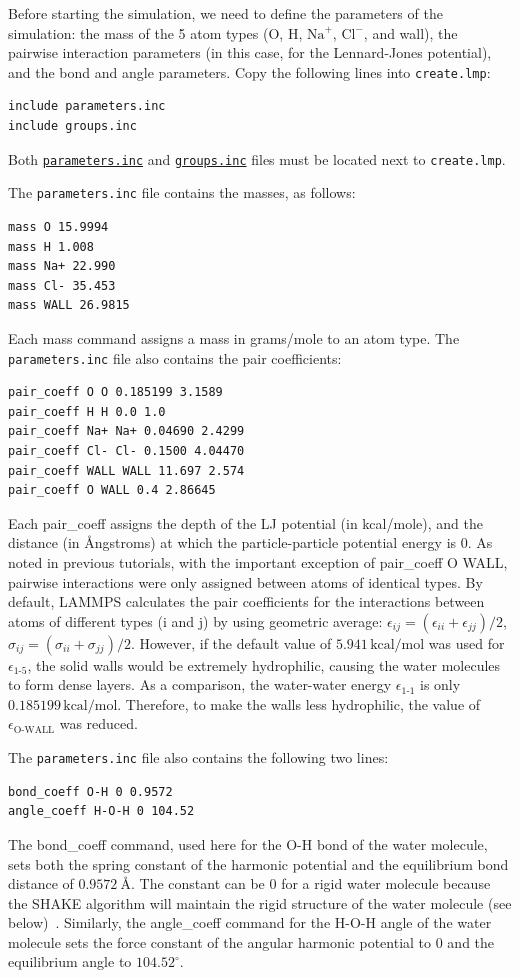\documentclass[9pt,tutorial]{livecoms}
\newcommand{\lmpcmd}[1]{\hspace{0pt}\colorbox{listing}{\textcolor{command}{\small{#1}}}\hspace{0pt}} %
\newcommand{\flecmd}[1]{\textcolor{command}{\texttt{#1}}} %
\newcommand{\dwlcmd}[1]{\textcolor{download}{\texttt{#1}}} %
\newcommand{\filepath}{https://raw.githubusercontent.com/lammpstutorials/lammpstutorials-article/main/files/}
\begin{document}
Before starting the simulation, we need to define the parameters of the
simulation: the mass of the 5 atom types (O, H, $\text{Na}^+$, $\text{Cl}^-$,
and wall), the pairwise interaction parameters (in this case, for the
Lennard-Jones potential), and the bond and angle parameters.  Copy the following
lines into \flecmd{create.lmp}:
\begin{lstlisting}
include parameters.inc
include groups.inc
\end{lstlisting}
Both \href{\filepath tutorial4/parameters.inc}{\dwlcmd{parameters.inc}}
and \href{\filepath tutorial4/groups.inc}{\dwlcmd{groups.inc}} files
must be located next to \flecmd{create.lmp}.

The \flecmd{parameters.inc} file contains the masses, as follows:
\begin{lstlisting}
mass O 15.9994
mass H 1.008
mass Na+ 22.990
mass Cl- 35.453
mass WALL 26.9815
\end{lstlisting}
Each \lmpcmd{mass} command assigns a mass in grams/mole to an atom type.
The \flecmd{parameters.inc} file also contains the pair coefficients:
\begin{lstlisting}
pair_coeff O O 0.185199 3.1589
pair_coeff H H 0.0 1.0
pair_coeff Na+ Na+ 0.04690 2.4299
pair_coeff Cl- Cl- 0.1500 4.04470
pair_coeff WALL WALL 11.697 2.574
pair_coeff O WALL 0.4 2.86645
\end{lstlisting}
Each \lmpcmd{pair\_coeff} assigns the depth of the LJ potential
(in kcal/mole), and the distance (in Ångstroms) at which the particle-particle
potential energy is 0.  As noted in previous tutorials, with the important exception of
\lmpcmd{pair\_coeff O WALL}, pairwise interactions were only assigned between
atoms of identical types.  By default, LAMMPS calculates the pair coefficients for the
interactions between atoms of different types (i and j) by using geometric average:
$\epsilon_{ij} = (\epsilon_{ii} + \epsilon_{jj})/2$,  $\sigma_{ij} = (\sigma_{ii} + \sigma_{jj})/2$.
However, if the default value of $5.941\,\text{kcal/mol}$ was used for $\epsilon_\text{1-5}$, the solid
walls would be extremely hydrophilic, causing the water molecules to form dense layers.  As a
comparison, the water-water energy $\epsilon_\text{1-1}$ is only $0.185199\,\text{kcal/mol}$.
Therefore, to make the walls less hydrophilic, the value of $\epsilon_\text{O-WALL}$
was reduced.

The \flecmd{parameters.inc} file also contains the following two lines:
\begin{lstlisting}
bond_coeff O-H 0 0.9572
angle_coeff H-O-H 0 104.52
\end{lstlisting}
The \lmpcmd{bond\_coeff} command, used here for the O-H bond of the water
molecule, sets both the spring constant of the harmonic potential and the
equilibrium bond distance of $0.9572~\text{\AA{}}$.  The constant can be 0 for a
rigid water molecule because the SHAKE algorithm will maintain the rigid
structure of the water molecule (see below)~\cite{ryckaert1977numerical, andersen1983rattle}.
Similarly, the \lmpcmd{angle\_coeff} command for the H-O-H angle of the water molecule sets
the force constant of the angular harmonic potential to 0 and the equilibrium
angle to $104.52^\circ$.
\end{document}
